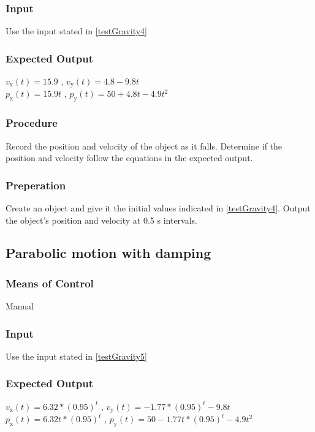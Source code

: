 \documentclass[12pt]{article}
\begin{document}
\subsubsection{Input}
Use the input stated in \ref{testGravity4}

\subsubsection{Expected Output}
$v_\text{x}(t) = 15.9$ , $v_\text{y}(t) = 4.8  -9.8t$ \\
$p_\text{x}(t) = 15.9t$ , $p_\text{y}(t) = 50 + 4.8t  -4.9t^{2}$
 
\subsubsection{Procedure}
Record the position and velocity of the object as it falls. Determine if the 
position and velocity follow the equations in the expected output.  

\subsubsection{Preperation}
Create an object and give it the initial values indicated in \ref{testGravity4}.
Output the object's position and velocity at 0.5 s intervals.


\subsection{Parabolic motion with damping}
\subsubsection{Means of Control}
Manual
\subsubsection{Input}
Use the input stated in \ref{testGravity5}

\subsubsection{Expected Output}
$v_\text{x}(t) = 6.32*(0.95)^{t}$ , $v_\text{y}(t) = -1.77*(0.95)^{t}  -9.8t$ \\
$p_\text{x}(t) = 6.32t*(0.95)^{t}$ , $p_\text{y}(t) = 50  -1.77t*(0.95)^{t}  -4.9t^{2}$
 
\end{document}

